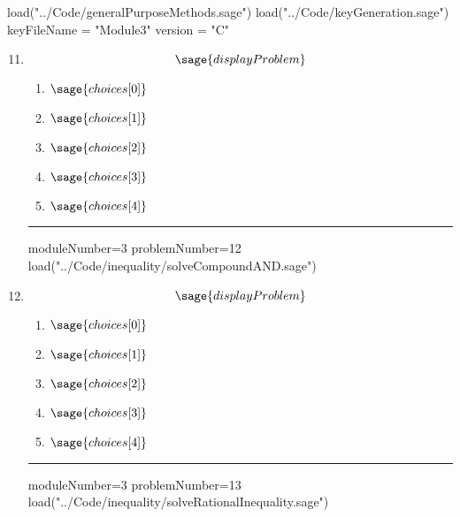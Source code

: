 \documentclass[14pt]{article}
\newcommand{\litem}[1]{\item#1\hspace*{-1cm}\rule{\textwidth}{0.4pt}}
\begin{document}
\pagestyle{fancy}

\begin{sagesilent}
load("../Code/generalPurposeMethods.sage")
load("../Code/keyGeneration.sage")
keyFileName = "Module3"
version = "C"
\end{sagesilent}

\begin{enumerate}
\setcounter{enumi}{10}


\begin{sagesilent}
moduleNumber=3
problemNumber=11
load("../Code/inequality/solveIntegerInequality.sage")
\end{sagesilent}

\litem{ 

\[ \sage{displayProblem} \]

	\begin{enumerate}[label=\Alph*.]
		\item \( \sage{choices[0]} \)
		\item \( \sage{choices[1]} \)
		\item \( \sage{choices[2]} \)
		\item \( \sage{choices[3]} \)
		\item \( \sage{choices[4]} \)
	\end{enumerate}

}

\begin{sagesilent}
moduleNumber=3
problemNumber=12
load("../Code/inequality/solveCompoundAND.sage")
\end{sagesilent}

\litem{ 

\[ \sage{displayProblem} \]

	\begin{enumerate}[label=\Alph*.]
    \item \( \sage{choices[0]} \)
    \item \( \sage{choices[1]} \)
    \item \( \sage{choices[2]} \)
    \item \( \sage{choices[3]} \)
    \item \( \sage{choices[4]} \)
	\end{enumerate}

}

\begin{sagesilent}
moduleNumber=3
problemNumber=13
load("../Code/inequality/solveRationalInequality.sage")
\end{sagesilent}


\end{enumerate}
\end{document}
